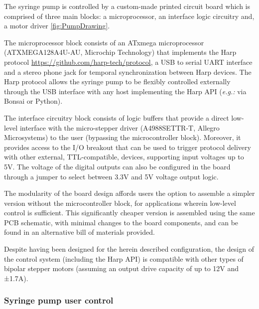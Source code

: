 The syringe pump is controlled by a custom-made printed circuit board which is comprised of three main blocks: a microprocessor, an interface logic circuitry and, a motor driver \cref{fig:PumpDrawing}.

The microprocessor block consists of an ATxmega microprocessor (ATXMEGA128A4U-AU, Microchip Technology) that implements the Harp protocol \url{https://github.com/harp-tech/protocol}, a USB to serial UART interface and a stereo phone jack for temporal synchronization between Harp devices. The Harp protocol allows the syringe pump to be flexibly controlled externally through the USB interface with any host implementing the Harp API (\textit{e.g.:} via Bonsai\citep{Lopes2015} or Python).

The interface circuitry block consists of logic buffers that provide a direct low-level interface with the micro-stepper driver (A4988SETTR-T, Allegro Microsystems) to the user (bypassing the microcontroller block). Moreover, it provides access to the I/O breakout that can be used to trigger protocol delivery with other external, TTL-compatible, devices, supporting input voltages up to 5V. The voltage of the digital outputs can also be configured in the board through a jumper to select between 3.3V and 5V voltage output logic.

The modularity of the board design affords users the option to assemble a simpler version without the microcontroller block, for applications wherein low-level control is sufficient. This significantly cheaper version is assembled using the same PCB schematic, with minimal changes to the board components, and can be found in an alternative bill of materials provided.

Despite having been designed for the herein described configuration, the design of the control system (including the Harp API) is compatible with other types of bipolar stepper motors (assuming an output drive capacity of up to 12V and ±1.7A).

\subsubsection*{Syringe pump user control}


